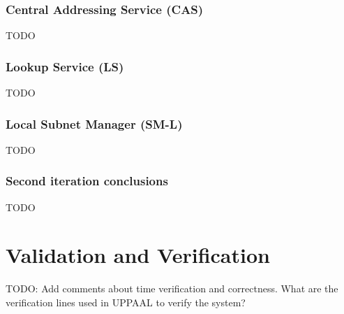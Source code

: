 \subsubsection{Central Addressing Service (CAS)}
TODO
\subsubsection{Lookup Service (LS)}
TODO
\subsubsection{Local Subnet Manager (SM-L)}
TODO
\subsubsection{Second iteration conclusions}
TODO

\section{Validation and Verification}
TODO: Add comments about time verification and correctness. What are the
verification lines used in UPPAAL to verify the system?

